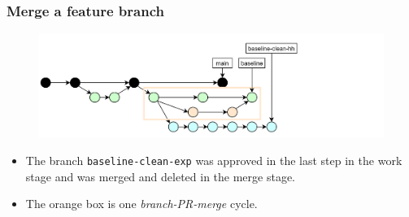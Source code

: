 \documentclass[aspectratio=169]{beamer}
\begin{document}
\begin{frame}
	\frametitle{Merge a feature branch}

	\vspace{-.5cm}
	\begin{minipage}[t][5cm][t]{\textwidth}
		\begin{figure}
			\centering
			\includegraphics[width=\textwidth]{./img/dime-gitflow-network-2-4.png}
		\end{figure}
	\end{minipage}

	\vspace{-.5cm}
	\begin{minipage}[t][5cm][t]{\textwidth}
		\begin{itemize}
			\setlength\itemsep{.5em}
			\item The branch \texttt{baseline-clean-exp} was
			approved in the last step in the work stage and
			was merged and deleted in the merge stage.
			\item The orange box is one \textit{branch-PR-merge} cycle.
		\end{itemize}
	\end{minipage}
\end{frame}
\end{document}
